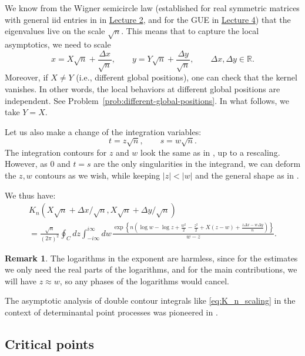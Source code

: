 \documentclass[letterpaper,11pt,oneside,reqno]{article}
\numberwithin{equation}{section}
\newcommand{\ssp}{\hspace{1pt}}
\theoremstyle{definition}
\newtheorem{remark}[proposition]{Remark}
\begin{document}
We know from the Wigner semicircle law
(established for real symmetric matrices with general iid entries in
in \href{https://lpetrov.cc/rmt25/rmt25-notes/rmt2025-l02.pdf}{Lecture 2},
and for the GUE in \href{https://lpetrov.cc/rmt25/rmt25-notes/rmt2025-l04.pdf}{Lecture 4})
that the eigenvalues live on the scale $\sqrt n$. This means that to capture the local asymptotics,
we need to scale
\begin{equation}
	\label{eq:scaling_x-y}
	x=X\sqrt n+\frac{\Delta x}{\sqrt n},\qquad y=Y\sqrt n+\frac{\Delta y}{\sqrt n},\qquad
	\Delta x,\Delta y\in\mathbb{R}.
\end{equation}
Moreover, if $X\ne Y$ (i.e., different global positions), one can check that the kernel
vanishes. In other words, the local behaviors at different global positions are independent.
See Problem~\ref{prob:different-global-positions}.
In what follows, we take $Y=X$.

Let us also make a change of the integration variables:
\begin{equation*}
	t=z\sqrt n,\qquad s=w\sqrt n.
\end{equation*}
The integration contours for $z$ and $w$ look the same as in
, up to a rescaling. However, as $0$
and $t=s$
are the only singularities in the integrand, we can deform the $z,w$
contours as we wish, while keeping $|z|<|w|$
and the general shape as in .

We thus have:
\begin{multline}
	\label{eq:K_n_scaling}
	K_n(X\sqrt n+\Delta x/\sqrt n,X\sqrt n+\Delta y/\sqrt n)\\=
	\frac{\sqrt n}{(2\pi)^2}
	\oint_C dz\int_{-i\infty}^{i\infty}dw\ssp
	\frac{\exp
		\left\{
			n\left(
				\log w -\log z
				+\frac{w^2}{2}-\frac{z^2}{2}
				+X(z-w)+\frac{z \Delta x-w \Delta y}{n}
			\right)
		\right\}
	}{w-z}.
\end{multline}
\begin{remark}
	\label{rmk:log-harmless}
	The logarithms in the exponent are harmless, since for the
	estimates we only need the real parts of the logarithms,
	and for the main contributions, we will have $z\approx w$, so
	any phases of the logarithms would cancel.
\end{remark}

The asymptotic analysis of double contour integrals like
\eqref{eq:K_n_scaling} in the context of determinantal point processes
was pioneered in \cite[Section~3]{Okounkov2002}.

\subsection{Critical points}
\label{sub:critical-points}
\end{document}
